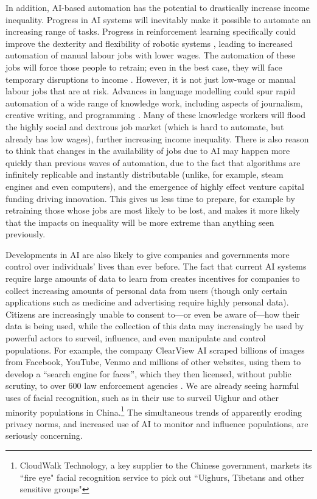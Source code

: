 \documentclass{article}
\begin{document}
In addition, AI-based automation has the potential to drastically increase income inequality. Progress in AI systems will inevitably make it possible to automate an increasing range of tasks. Progress in reinforcement learning specifically could improve the dexterity and flexibility of robotic systems \citep{ibarz_how_2021}, leading to increased automation of manual labour jobs with lower wages. The automation of these jobs will force those people to retrain; even in the best case, they will face temporary disruptions to income \citep{lee_ai_2018}. However, it is not just low-wage or manual labour jobs that are at risk. Advances in language modelling could spur rapid automation of a wide range of knowledge work, including aspects of journalism, creative writing, and programming \citep{tamkin_understanding_2021}. Many of these knowledge workers will flood the highly social and dextrous job market (which is hard to automate, but already has low wages), further increasing income inequality\citep{lee_ai_2018}. There is also reason to think that changes in the availability of jobs due to AI may happen more quickly than previous waves of automation, due to the fact that algorithms are infinitely replicable and instantly distributable (unlike, for example, steam engines and even computers), and the emergence of highly effect venture capital funding driving innovation\citep{lee_ai_2018}. This gives us less time to prepare, for example by retraining those whose jobs are most likely to be lost, and makes it more likely that the impacts on inequality will be more extreme than anything seen previously.

Developments in AI are also likely to give companies and governments more control over individuals’ lives than ever before. The fact that current AI systems require large amounts of data to learn from creates incentives for companies to collect increasing amounts of personal data from users (though only certain applications such as medicine and advertising require highly personal data). Citizens are increasingly unable to consent to---or even be aware of---how their data is being used, while the collection of this data may increasingly be used by powerful actors to surveil, influence, and even manipulate and control populations. For example, the company ClearView AI scraped billions of images from Facebook, YouTube, Venmo and millions of other websites, using them to develop a ``search engine for faces'', which they then licensed, without public scrutiny, to over 600 law enforcement agencies \citep{hill_secretive_2020}. We are already seeing harmful uses of facial recognition, such as in their use to surveil Uighur and other minority populations in China\citep{hogarth_state_2019}.\footnote{CloudWalk Technology, a key supplier to the Chinese government, markets its ``fire eye" facial recognition service to pick out ``Uighurs, Tibetans and other sensitive groups"} The simultaneous trends of apparently eroding privacy norms, and increased use of AI to monitor and influence populations, are seriously concerning.
\end{document}
